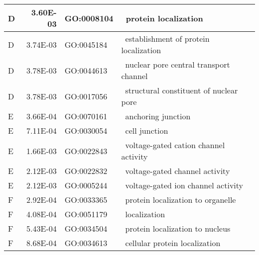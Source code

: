 \begin{longtable}{|l|r|l|l|}
\hline
D                & 3.60E-03                                       & GO:0008104       & ~protein localization                                                 \\
\hline
D                & 3.74E-03                                       & GO:0045184       & ~establishment of protein localization                                \\
\hline
D                & 3.78E-03                                       & GO:0044613       & ~nuclear pore central transport channel                               \\
\hline
D                & 3.78E-03                                       & GO:0017056       & ~structural constituent of nuclear pore                               \\
\hline
E                & 3.66E-04                                       & GO:0070161       & ~anchoring junction                                                   \\
\hline
E                & 7.11E-04                                       & GO:0030054       & ~cell junction                                                        \\
\hline
E                & 1.66E-03                                       & GO:0022843       & ~voltage-gated cation channel activity                                \\
\hline
E                & 2.12E-03                                       & GO:0022832       & ~voltage-gated channel activity                                       \\
\hline
E                & 2.12E-03                                       & GO:0005244       & ~voltage-gated ion channel activity                                   \\
\hline
F                & 2.92E-04                                       & GO:0033365       & ~protein localization to organelle                                    \\
\hline
F                & 4.08E-04                                       & GO:0051179       & ~localization                                                         \\
\hline
F                & 5.43E-04                                       & GO:0034504       & ~protein localization to nucleus                                      \\
\hline
F                & 8.68E-04                                       & GO:0034613       & ~cellular protein localization                                        \\

\end{longtable}
